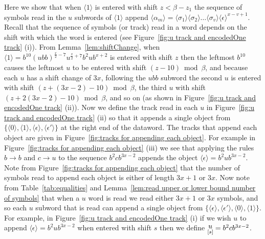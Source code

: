 \documentclass[11pt]{article} \usepackage{amsfonts,amsmath,amssymb,amsthm}
\newcommand{\tne}[1]{\ensuremath{\langle #1\rangle}}
\newcommand{\encodeOne}{\tne{1}}
\newcommand{\encodeOneSequence}{\ensuremath{b^{10}(ubb)^{\frac{x}{2}-7}u^{\frac{x}{2}+7}b^{2}ub^{x+2}}}
\newcommand{\encodeZero}{\tne{0}}
\newcommand{\encodeDeletion}{\tne{\epsilon}}
\newcommand{\encodeDeletionSequence}{\ensuremath{b^2ub^{3x-2}}}
\newcommand{\encodeDeletionTrack}{\ensuremath{b^2cb^{3x-2}}}
\newcommand{\encodeDeletionPrime}{\tne{\epsilon'}}
\newcommand{\track}[2]{\raisebox{2.5pt}{\ensuremath{\underset{[#1]}#2}}}
\begin{document}
Here we show that when $\encodeOne$ is entered with shift $z<\beta-z_1$ the sequence of symbols read in the $u$ subwords of $\encodeOne$ append $\tne{\alpha_m}=\tne{\sigma_1}\tne{\sigma_2}\ldots\tne{\sigma_v}\encodeDeletion^{x-v+1}$. 
Recall that the sequence of symbols (or track) read in a word depends on the shift with which the word is entered (see Figure~\ref{fig:u track and encodedOne track} (i)). 
From Lemma~\ref{lem:shiftChange}, when $\encodeOne=\encodeOneSequence$ is entered with shift $z$ then the leftmost $b^{10}$ causes the leftmost $u$ to be entered with shift $(z-10)\bmod\beta$, and because each $u$ has a shift change of $3x$, following the $ubb$ subword the second $u$ is entered with shift $(z+(3x-2)-10)\bmod\beta$, the third $u$ with shift $(z+2(3x-2)-10)\bmod\beta$, and so on (as shown in Figure~\ref{fig:u track and encodedOne track} (ii)). 
Now we define the track read in each $u$ in Figure~\ref{fig:u track and encodedOne track} (ii) so that it appends a single object from $\{\encodeZero,\encodeOne,\encodeDeletion,\encodeDeletionPrime\}$ at the right end of the dataword. 
The tracks that append each object are given in Figure~\ref{fig:tracks for appending each object}. For example in Figure~\ref{fig:tracks for appending each object} (iii) we see that applying the rules $b\rightarrow b$ and $c\rightarrow u$ to the sequence $\encodeDeletionTrack$ appends the object $\encodeDeletion=\encodeDeletionSequence$.
Note from Figure~\ref{fig:tracks for appending each object} that the number of symbols read to append each object is either of length $3x+1$ or $3x$.
Now note from Table~\ref{tab:equalities} and Lemma~\ref{lem:read upper or lower bound number of symbols} that when a $u$ word is read we read either $3x+1$ or $3x$ symbols, and so each $u$ subword that is read can append a single object from $\{\encodeDeletion,\encodeDeletionPrime,\encodeZero,\encodeOne\}$. For example, in Figure~\ref{fig:u track and encodedOne track} (i) if we wish $u$ to append $\encodeDeletion=\encodeDeletionSequence$ when entered with shift $s$ then we define $\track{s}{u}=\encodeDeletionTrack$. 
\end{document}

